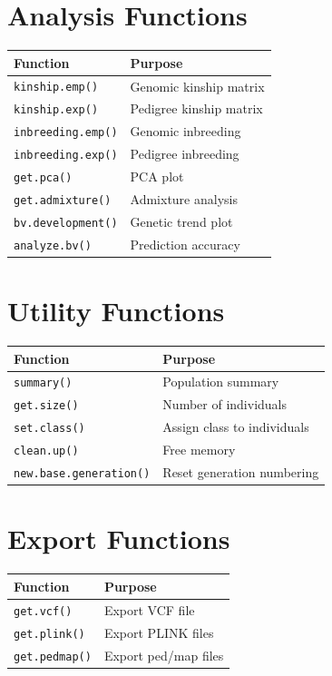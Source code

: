 \documentclass[
  letterpaper,
]{book}
\begin{document}
\section{Analysis Functions}\label{analysis-functions}

\begin{longtable}[]{@{}ll@{}}
\toprule\noalign{}
Function & Purpose \\
\midrule\noalign{}
\endhead
\bottomrule\noalign{}
\endlastfoot
\texttt{kinship.emp()} & Genomic kinship matrix \\
\texttt{kinship.exp()} & Pedigree kinship matrix \\
\texttt{inbreeding.emp()} & Genomic inbreeding \\
\texttt{inbreeding.exp()} & Pedigree inbreeding \\
\texttt{get.pca()} & PCA plot \\
\texttt{get.admixture()} & Admixture analysis \\
\texttt{bv.development()} & Genetic trend plot \\
\texttt{analyze.bv()} & Prediction accuracy \\
\end{longtable}

\section{Utility Functions}\label{utility-functions}

\begin{longtable}[]{@{}ll@{}}
\toprule\noalign{}
Function & Purpose \\
\midrule\noalign{}
\endhead
\bottomrule\noalign{}
\endlastfoot
\texttt{summary()} & Population summary \\
\texttt{get.size()} & Number of individuals \\
\texttt{set.class()} & Assign class to individuals \\
\texttt{clean.up()} & Free memory \\
\texttt{new.base.generation()} & Reset generation numbering \\
\end{longtable}

\section{Export Functions}\label{export-functions}

\begin{longtable}[]{@{}ll@{}}
\toprule\noalign{}
Function & Purpose \\
\midrule\noalign{}
\endhead
\bottomrule\noalign{}
\endlastfoot
\texttt{get.vcf()} & Export VCF file \\
\texttt{get.plink()} & Export PLINK files \\
\texttt{get.pedmap()} & Export ped/map files \\
\end{longtable}
\end{document}
